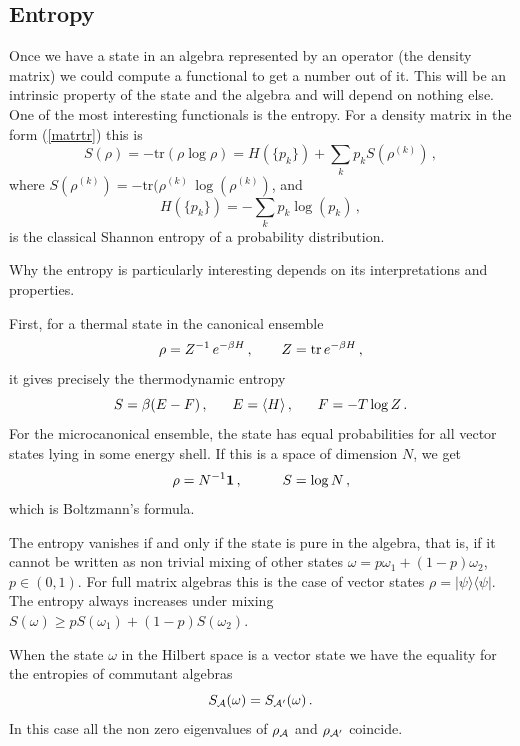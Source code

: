 \documentclass[12pt]{article}
\numberwithin{equation}{section}
\newcommand{\be}{\begin{equation}}
\newcommand{\ee}{\end{equation}}
\begin{document}
\subsection{Entropy}
Once we have a state in an algebra represented by an operator (the density matrix) we could compute a functional to get a number out of it. This will be an intrinsic property of the state and the algebra and will depend on nothing else. One of the most interesting functionals is the entropy. For a density matrix in the form (\ref{matrtr}) this is   
\begin{equation}
S(\rho)=-\textrm{tr}(\rho\log \rho)=H(\{p_k\})+\sum_k p_k S(\rho^{(k)})\,,
\end{equation}
where $S(\rho^{(k)})=-\textrm{tr}(\rho^{(k)} \, \log(\rho^{(k)})$, and
\begin{equation}
H(\{p_k\})=-\sum_k p_k \log(p_k)\,,
\end{equation}
is the classical Shannon entropy of a probability distribution. 

Why the entropy is particularly interesting depends on its interpretations and properties. 

First, for a thermal state in the canonical ensemble 
\be
\rho=Z^{-1}\, e^{-\beta H}\,,\hspace{.7cm} Z=\textrm{tr} \, e^{-\beta H}\,,
\ee
it gives precisely the thermodynamic entropy
\be 
S= \beta (E-F) \,,\hspace{.6cm} E= \langle H\rangle\,,\hspace{.6cm} F=-T \log Z\,.
\ee
For the microcanonical ensemble, the state has equal probabilities for all vector states lying in some energy shell. If this is a space of dimension $N$, we get
\be
\rho= N^{-1} {\bf 1}\,,\hspace{1cm} S=\log N\,,
\ee
which is Boltzmann's formula. 

The entropy vanishes if and only if the state is pure in the algebra, that is, if it cannot be written as non trivial mixing of other states $\omega= p \omega_1+(1-p) \omega_2$, $p\in (0,1)$. For full matrix algebras this is the case of vector states $\rho=|\psi\rangle \langle\psi|$. The entropy always increases under mixing $S(\omega)\ge  p S(\omega_1)+(1-p) S(\omega_2)$. 

When the state $\omega$ in the Hilbert space is a vector state we have the equality for the entropies of commutant algebras 
\begin{equation}
S_{{\cal A}}(\omega)=S_{{\cal A}'}(\omega)\,.
\end{equation}
In this case all the non zero eigenvalues of $\rho_{\cal A}$ and $\rho_{{\cal A}'}$ coincide.
\end{document}
